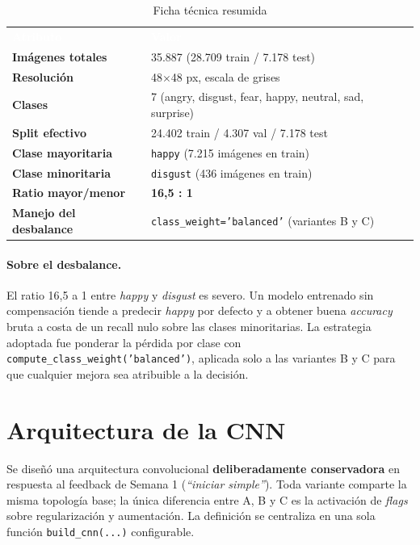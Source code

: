 \documentclass[10pt,a4paper,twocolumn]{article}
\begin{document}
\begin{table}[H]
\centering
\caption{Ficha técnica resumida}
\label{tab:ficha}
\small
\setlength{\arrayrulewidth}{0.5pt}
\renewcommand{\arraystretch}{1.15}
\begin{tabularx}{\columnwidth}{>{\bfseries}lX}
\rowcolor{tableheader}\textcolor{white}{\textbf{Atributo}} & \textcolor{white}{\textbf{Valor}}\\
Imágenes totales      & 35.887 (28.709 train / 7.178 test)\\
Resolución            & 48$\times$48 px, escala de grises\\
Clases                & 7 (angry, disgust, fear, happy, neutral, sad, surprise)\\
Split efectivo        & 24.402 train / 4.307 val / 7.178 test\\
Clase mayoritaria     & \texttt{happy} (7.215 imágenes en train)\\
Clase minoritaria     & \texttt{disgust} (436 imágenes en train)\\
Ratio mayor/menor     & \textbf{16,5 : 1}\\
Manejo del desbalance & \texttt{class\_weight='balanced'} (variantes B y C)\\
\end{tabularx}
\end{table}

\paragraph{Sobre el desbalance.} El ratio 16,5 a 1 entre \textit{happy} y \textit{disgust} es severo. Un modelo entrenado sin compensación tiende a predecir \textit{happy} por defecto y a obtener buena \textit{accuracy} bruta a costa de un recall nulo sobre las clases minoritarias. La estrategia adoptada fue ponderar la pérdida por clase con \texttt{compute\_class\_weight('balanced')}, aplicada solo a las variantes B y C para que cualquier mejora sea atribuible a la decisión.

\section{Arquitectura de la CNN}

Se diseñó una arquitectura convolucional \textbf{deliberadamente conservadora} en respuesta al feedback de Semana 1 (\textit{``iniciar simple''}). Toda variante comparte la misma topología base; la única diferencia entre A, B y C es la activación de \textit{flags} sobre regularización y aumentación. La definición se centraliza en una sola función \texttt{build\_cnn(...)} configurable.
\end{document}
